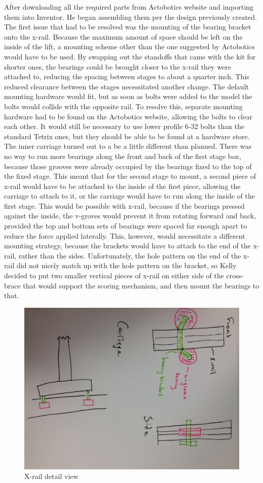 \documentclass{article}
\begin{document}
 After downloading all the required parts from Actobotics website and importing them into Inventor. He began assembling them per the design previously created. The first issue that had to be resolved was the mounting of the bearing bracket onto the x-rail. Because the maximum amount of space should be left on the inside of the lift, a mounting scheme other than the one suggested by Actobotics would have to be used. By swapping out the standoffs that came with the kit for shorter ones, the bearings could be brought closer to the x-rail they were attached to, reducing the spacing between stages to about a quarter inch. This reduced clearance between the stages necessitated another change. The default mounting hardware would fit, but as soon as bolts were added to the model the bolts would collide with the opposite rail. To resolve this, separate mounting hardware had to be found on the Actobotics website, allowing the bolts to clear each other. It would still be necessary to use lower profile 6-32 bolts than the standard Tetrix ones, but they should be able to be found at a hardware store. The inner carriage turned out to a be a little different than planned. There was no way to run more bearings along the front and back of the first stage box, because those grooves were already occupied by the bearings fixed to the top of the fixed stage. This meant that for the second stage to mount, a second piece of x-rail would have to be attached to the inside of the first piece, allowing the carriage to attach to it, or the carriage would have to run along the inside of the first stage. This would be possible with x-rail, because if the bearings pressed against the inside, the v-groves would prevent it from rotating forward and back, provided the top and bottom sets of bearings were spaced far enough apart to reduce the force applied laterally. This, however, would necessitate a different mounting strategy, because the brackets would have to attach to the end of the x-rail, rather than the sides. Unfortunately, the hole pattern on the end of the x-rail did not nicely match up with the hole pattern on the bracket, so Kelly decided to put two smaller vertical pieces of x-rail on either side of the cross-brace that would support the scoring mechanism, and then mount the bearings to that. 
 
 \begin{figure}
     \centering
     \includegraphics[width=.6\textwidth,angle=90]{05_10-01/images/xrail.jpg}
     \caption{X-rail detail view}
     \label{fig:my_label}
 \end{figure}
\end{document}
